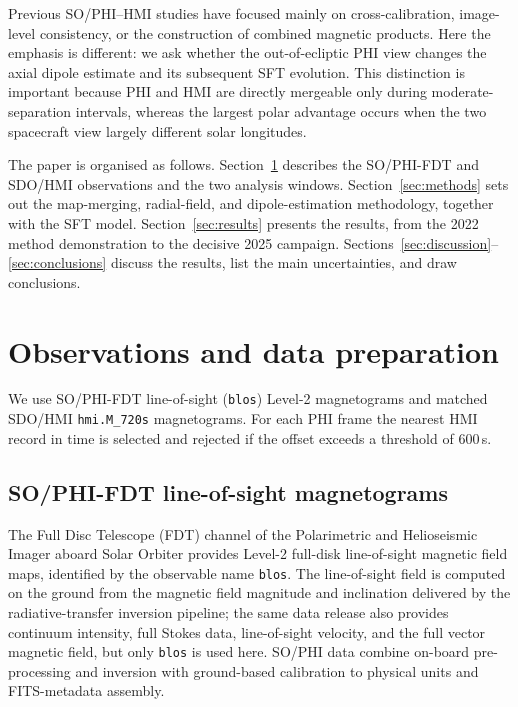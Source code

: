 \documentclass{aa}
\begin{document}
Previous SO/PHI--HMI studies have focused mainly on cross-calibration, image-level consistency, or the construction of combined magnetic products. Here the emphasis is different: we ask whether the out-of-ecliptic PHI view changes the axial dipole estimate and its subsequent SFT evolution. This distinction is important because PHI and HMI are directly mergeable only during moderate-separation intervals, whereas the largest polar advantage occurs when the two spacecraft view largely different solar longitudes.

The paper is organised as follows. Section~\ref{sec:data} describes the SO/PHI-FDT and SDO/HMI observations and the two analysis windows. Section~\ref{sec:methods} sets out the map-merging, radial-field, and dipole-estimation methodology, together with the SFT model. Section~\ref{sec:results} presents the results, from the 2022 method demonstration to the decisive 2025 campaign. Sections~\ref{sec:discussion}--\ref{sec:conclusions} discuss the results, list the main uncertainties, and draw conclusions.

\section{Observations and data preparation}
\label{sec:data}

We use SO/PHI-FDT line-of-sight (\texttt{blos}) Level-2 magnetograms and matched SDO/HMI \texttt{hmi.M\_720s} magnetograms. For each PHI frame the nearest HMI record in time is selected and rejected if the offset exceeds a threshold of 600\,s.

\subsection{SO/PHI-FDT line-of-sight magnetograms}
\label{sec:data-phi}

The Full Disc Telescope (FDT) channel of the Polarimetric and Helioseismic Imager aboard Solar Orbiter \citep{Solanki2020} provides Level-2 full-disk line-of-sight magnetic field maps, identified by the observable name \texttt{blos}. The line-of-sight field is computed on the ground from the magnetic field magnitude and inclination delivered by the radiative-transfer inversion pipeline; the same data release also provides continuum intensity, full Stokes data, line-of-sight velocity, and the full vector magnetic field, but only \texttt{blos} is used here. SO/PHI data combine on-board pre-processing and inversion with ground-based calibration to physical units and FITS-metadata assembly.
\end{document}

